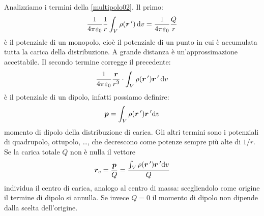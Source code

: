 Analizziamo i termini della \eqref{multipolo02}. Il primo:
\[\frac{1}{4\pi\varepsilon_0}\frac{1}{r}\int_V\rho(\boldsymbol{r}\,')\,\mathrm{d} v=\frac{1}{4\pi\varepsilon_0}\frac{Q}{r}\]
è il potenziale di un monopolo, cioè il potenziale di un punto in cui è accumulata tutta la carica della distribuzione. A grande distanza è un'approssimazione accettabile. Il secondo termine corregge il precedente:
\[\frac{1}{4\pi\varepsilon_0}\frac{\boldsymbol{r}}{r^3}\cdot\int_V\rho(\boldsymbol{r}\,')\boldsymbol{r}\,'\,\mathrm{d} v\]
è il potenziale di un dipolo, infatti possiamo definire:
\[\boldsymbol{p}=\int_V\rho(\boldsymbol{r}\,')\boldsymbol{r}\,'\mathrm{d} v\]
momento di dipolo della distribuzione di carica. Gli altri termini sono i potenziali di quadrupolo, ottupolo, \ldots, che decrescono come potenze sempre più alte di $1/r$. Se la carica totale $Q$ non è nulla il vettore
\begin{equation}
  \boldsymbol{r}_c=\frac{\boldsymbol{p}}{Q}=\frac{\int_V\rho(\boldsymbol{r}\,')\boldsymbol{r}\,'\mathrm{d} v}{Q}
\end{equation}
individua il centro di carica, analogo al centro di massa: scegliendolo come origine il termine di dipolo si annulla. Se invece $Q=0$ il momento di dipolo non dipende dalla scelta dell'origine.
